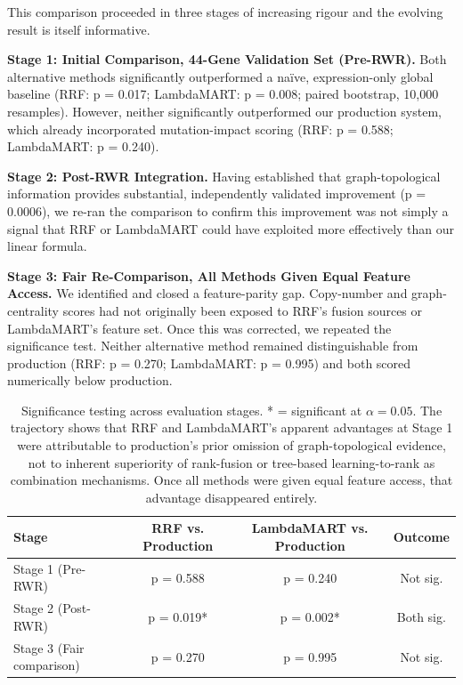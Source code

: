 \documentclass[author={Karen Coutinho, Ishaan Bhalla, Aman Raj, Dixit Kaloorani Malarmannan},
                supervisor={Dr. Daniel D'Andrea},
                degree={MSc},
                title={CellSelector Omics: A Multi-Omics Recommendation System for Cell Line Selection},
                subtitle={},
                type={},
                year={2026}]{dissertation}
\begin{document}
This comparison proceeded in three stages of increasing rigour and the evolving result is itself informative.

{\bf Stage 1: Initial Comparison, 44-Gene Validation Set (Pre-RWR).} Both alternative methods significantly outperformed a naïve, expression-only global baseline (RRF: p = 0.017; LambdaMART: p = 0.008; paired bootstrap, 10,000 resamples). However, neither significantly outperformed our production system, which already incorporated mutation-impact scoring (RRF: p = 0.588; LambdaMART: p = 0.240).

{\bf Stage 2: Post-RWR Integration.} Having established that graph-topological information provides substantial, independently validated improvement (p = 0.0006), we re-ran the comparison to confirm this improvement was not simply a signal that RRF or LambdaMART could have exploited more effectively than our linear formula.

{\bf Stage 3: Fair Re-Comparison, All Methods Given Equal Feature Access.} We identified and closed a feature-parity gap. Copy-number and graph-centrality scores had not originally been exposed to RRF's fusion sources or LambdaMART's feature set. Once this was corrected, we repeated the significance test. Neither alternative method remained distinguishable from production (RRF: p = 0.270; LambdaMART: p = 0.995) and both scored numerically below production.

\begin{table}[t]
\centering
\begin{tabular}{|l|c|c|c|}
\hline
{\bf Stage} & {\bf RRF vs. Production} & {\bf LambdaMART vs. Production} & {\bf Outcome} \\
\hline
Stage 1 (Pre-RWR) & p = 0.588 & p = 0.240 & Not sig. \\
Stage 2 (Post-RWR) & p = 0.019* & p = 0.002* & Both sig. \\
Stage 3 (Fair comparison) & p = 0.270 & p = 0.995 & Not sig. \\
\hline
\end{tabular}
\caption{Significance testing across evaluation stages. * = significant at $\alpha = 0.05$. The trajectory shows that RRF and LambdaMART's apparent advantages at Stage 1 were attributable to production's prior omission of graph-topological evidence, not to inherent superiority of rank-fusion or tree-based learning-to-rank as combination mechanisms. Once all methods were given equal feature access, that advantage disappeared entirely.}
\label{tab:method-comparison}
\end{table}
\end{document}
